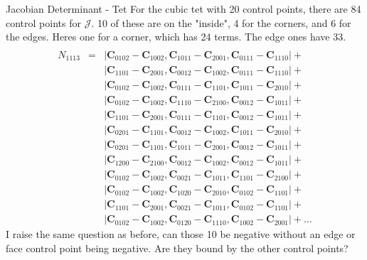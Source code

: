 \documentclass[12pt]{beamer}
\begin{document}
\begin{frame}{Jacobian Determinant - Tet}
For the cubic tet with 20 control points, there are 84 control points for $\mathcal{J}$. 10 of these are on the "inside", 4 for the corners, and 6 for the edges. Heres one for a corner, which has 24 terms. The edge ones have 33.
{
  \tiny
\begin{eqnarray*}
\\N_{1113}&=&\left|\mathbf{C}_{0102}-\mathbf{C}_{1002},\mathbf{C}_{1011}-\mathbf{C}_{2001},\mathbf{C}_{0111}-\mathbf{C}_{1110}\right|+\\&&\left|\mathbf{C}_{1101}-\mathbf{C}_{2001},\mathbf{C}_{0012}-\mathbf{C}_{1002},\mathbf{C}_{0111}-\mathbf{C}_{1110}\right|+\\&&\left|\mathbf{C}_{0102}-\mathbf{C}_{1002},\mathbf{C}_{0111}-\mathbf{C}_{1101},\mathbf{C}_{1011}-\mathbf{C}_{2010}\right|+\\&&\left|\mathbf{C}_{0102}-\mathbf{C}_{1002},\mathbf{C}_{1110}-\mathbf{C}_{2100},\mathbf{C}_{0012}-\mathbf{C}_{1011}\right|+\\&&\left|\mathbf{C}_{1101}-\mathbf{C}_{2001},\mathbf{C}_{0111}-\mathbf{C}_{1101},\mathbf{C}_{0012}-\mathbf{C}_{1011}\right|+\\&&\left|\mathbf{C}_{0201}-\mathbf{C}_{1101},\mathbf{C}_{0012}-\mathbf{C}_{1002},\mathbf{C}_{1011}-\mathbf{C}_{2010}\right|+\\&&\left|\mathbf{C}_{0201}-\mathbf{C}_{1101},\mathbf{C}_{1011}-\mathbf{C}_{2001},\mathbf{C}_{0012}-\mathbf{C}_{1011}\right|+\\&&\left|\mathbf{C}_{1200}-\mathbf{C}_{2100},\mathbf{C}_{0012}-\mathbf{C}_{1002},\mathbf{C}_{0012}-\mathbf{C}_{1011}\right|+\\&&\left|\mathbf{C}_{0102}-\mathbf{C}_{1002},\mathbf{C}_{0021}-\mathbf{C}_{1011},\mathbf{C}_{1101}-\mathbf{C}_{2100}\right|+\\&&\left|\mathbf{C}_{0102}-\mathbf{C}_{1002},\mathbf{C}_{1020}-\mathbf{C}_{2010},\mathbf{C}_{0102}-\mathbf{C}_{1101}\right|+\\&&\left|\mathbf{C}_{1101}-\mathbf{C}_{2001},\mathbf{C}_{0021}-\mathbf{C}_{1011},\mathbf{C}_{0102}-\mathbf{C}_{1101}\right|+\\&&\left|\mathbf{C}_{0102}-\mathbf{C}_{1002},\mathbf{C}_{0120}-\mathbf{C}_{1110},\mathbf{C}_{1002}-\mathbf{C}_{2001}\right|+\ldots
\end{eqnarray*}
}I raise the same question as before, can those 10 be negative without an edge or face control point being negative. Are they bound by the other control points?
\end{frame}
\end{document}
